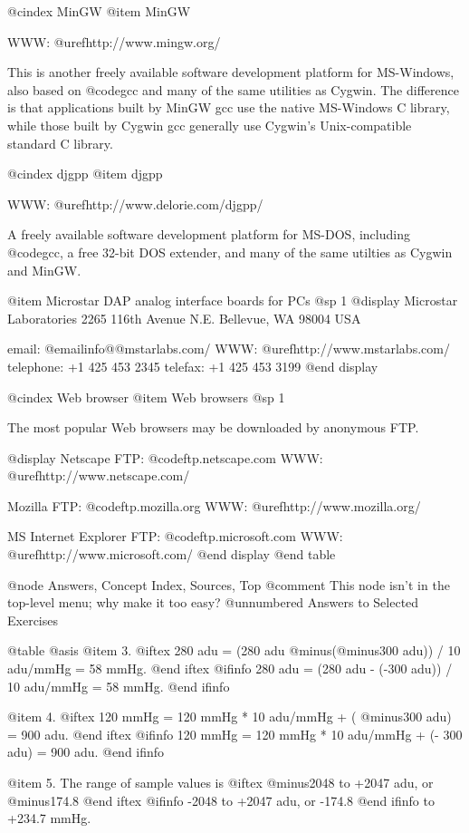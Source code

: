 {{{{{{{{{@cindex MinGW
@item MinGW

WWW: @uref{http://www.mingw.org/}

This is another freely available software development platform for MS-Windows,
also based on @code{gcc} and many of the same utilities as Cygwin.  The
difference is that applications built by MinGW gcc use the native MS-Windows C
library, while those built by Cygwin gcc generally use Cygwin's Unix-compatible
standard C library.  

@cindex djgpp
@item djgpp

WWW: @uref{http://www.delorie.com/djgpp/}

A freely available software development platform for MS-DOS, including
@code{gcc}, a free 32-bit DOS extender, and many of the same utilties
as Cygwin and MinGW.

@item Microstar DAP analog interface boards for PCs
@sp 1
@display
Microstar Laboratories
2265 116th Avenue N.E.
Bellevue, WA 98004 USA

email: @email{info@@mstarlabs.com/}
WWW: @uref{http://www.mstarlabs.com/}
telephone: +1 425 453 2345
telefax: +1 425 453 3199
@end display

@cindex Web browser
@item Web browsers
@sp 1

The most popular Web browsers may be downloaded by anonymous FTP.

@display
Netscape
FTP: @code{ftp.netscape.com}
WWW: @uref{http://www.netscape.com/}

Mozilla
FTP: @code{ftp.mozilla.org}
WWW: @uref{http://www.mozilla.org/}

MS Internet Explorer
FTP: @code{ftp.microsoft.com}
WWW: @uref{http://www.microsoft.com/}
@end display
@end table

@node     Answers, Concept Index, Sources, Top
@comment This node isn't in the top-level menu;  why make it too easy?
@unnumbered Answers to Selected Exercises

@table @asis
@item 3.
@iftex
280 adu = (280 adu @minus{}(@minus{}300 adu)) / 10 adu/mmHg = 58 mmHg.
@end iftex
@ifinfo
280 adu = (280 adu - (-300 adu)) / 10 adu/mmHg = 58 mmHg.
@end ifinfo

@item 4.
@iftex
120 mmHg = 120 mmHg * 10 adu/mmHg + ( @minus{}300 adu) = 900 adu.
@end iftex
@ifinfo
120 mmHg = 120 mmHg * 10 adu/mmHg + (- 300 adu) = 900 adu.
@end ifinfo

@item 5.
The range of sample values is
@iftex
@minus{}2048 to +2047 adu, or @minus{}174.8
@end iftex
@ifinfo
-2048 to +2047 adu, or -174.8
@end ifinfo
to +234.7 mmHg.

}}}}}}}}}
